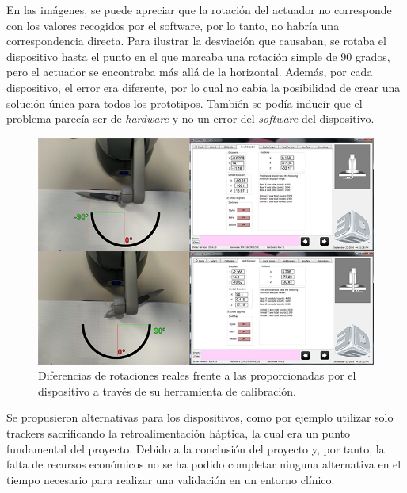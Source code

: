 En las imágenes, se puede apreciar que la rotación del actuador no corresponde con los valores recogidos por el software, por lo tanto, no habría una correspondencia directa. Para ilustrar la desviación que causaban, se rotaba el dispositivo hasta el punto en el que marcaba una rotación simple de 90 grados, pero el actuador se encontraba más allá de la horizontal. Además, por cada dispositivo, el error era diferente, por lo cual no cabía la posibilidad de crear una solución única para todos los prototipos. También se podía inducir que el problema parecía ser de \emph{hardware} y no un error del \emph{software} del dispositivo.


\begin{figure}[h]
\centering
\includegraphics[width=0.9\linewidth]{IMG/errorhaptic.png}
\caption{\label{fig:errorhaptic}Diferencias de rotaciones reales frente a las proporcionadas por el dispositivo a través de su herramienta de calibración.}
\end{figure}

Se propusieron alternativas para los dispositivos, como por ejemplo utilizar solo \ac{tracker}s sacrificando la retroalimentación háptica, la cual era un punto fundamental del proyecto. Debido a la conclusión del proyecto y, por tanto, la falta de recursos económicos no se ha podido completar ninguna alternativa en el tiempo necesario para realizar una validación en un entorno clínico.








